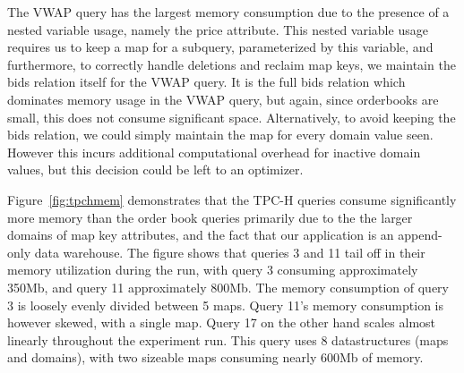 The VWAP query has the largest memory consumption due to the presence of a
nested variable usage, namely the price attribute. This nested variable usage
requires us to keep a map for a subquery, parameterized by this variable, and
furthermore, to correctly handle deletions and reclaim map keys, we maintain the
bids relation itself for the VWAP query. It is the full bids relation which
dominates memory usage in the VWAP query, but again, since orderbooks are
small, this does not consume significant space. Alternatively, to avoid keeping
the bids relation, we could simply maintain the map for every domain value
seen. However this incurs additional computational overhead for inactive domain
values, but this decision could be left to an optimizer.

Figure~\ref{fig:tpchmem} demonstrates that the TPC-H queries consume
significantly more memory than the order book queries primarily due to the the
larger domains of map key attributes, and the fact that our application is an
append-only data warehouse. The figure shows that queries 3 and 11 tail off in
their memory utilization during the run, with query 3 consuming approximately
350Mb, and query 11 approximately 800Mb.  The memory consumption of query 3 is
loosely evenly divided between 5 maps. Query 11's memory consumption is however
skewed, with a single map. Query 17 on the other hand scales almost linearly
throughout the experiment run. This query uses 8 datastructures (maps and
domains), with two sizeable maps consuming nearly 600Mb of memory.




